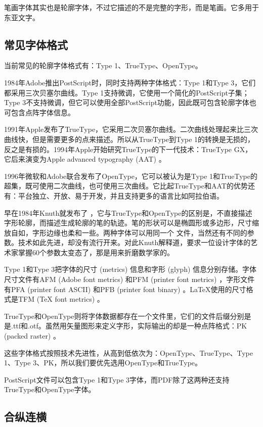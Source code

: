 笔画字体其实也是轮廓字体，不过它描述的不是完整的字形，而是笔画。它多用于东亚文字。

\subsection{常见字体格式}

当前常见的轮廓字体格式有：Type 1、TrueType、OpenType。

1984年Adobe\indexAdobe 推出PostScript时，同时支持两种字体格式：Type 1和Type 3，它们都采用三次贝塞尔曲线。Type 1支持微调，它使用一个简化的PostScript子集；Type 3不支持微调，但它可以使用全部PostScript功能，因此既可包含轮廓字体也可包含点阵字体信息。
    
1991年Apple\indexApple 发布了TrueType，它采用二次贝塞尔曲线。二次曲线处理起来比三次曲线快，但是需要更多的点来描述。所以从TrueType到Type 1的转换是无损的，反之是有损的。1994年Apple开始研究TrueType的下一代技术：TrueType GX，它后来演变为Apple advanced typography (AAT) 。

1996年微软和Adobe联合发布了OpenType，它可以被认为是Type 1和TrueType的超集，既可使用二次曲线，也可使用三次曲线。它比起TrueType和AAT的优势还有：平台独立、开放、易于开发，并且支持更多的语言比如阿拉伯语。

早在1984年Knuth就发布了 \MF ，它与TrueType和OpenType的区别是，不直接描述字形轮廓，而描述生成轮廓的笔的轨迹。笔的形状可以是椭圆形或多边形，尺寸缩放自如，字形边缘也柔和一些。两种字体可以用同一个 \MF 文件，当然还有不同的参数。\MF 技术如此先进，却没有流行开来。对此Knuth解释道，要求一位设计字体的艺术家掌握60个参数太变态了，那是用来折磨数学家的。

Type 1和Type 3把字体的尺寸 (metrics) 信息和字形 (glyph) 信息分别存储。字体尺寸文件有AFM (Adobe font metrics) 和PFM (printer font metrics) ，字形文件有PFA (printer font ASCII) 和PFB (printer font binary) 。\LaTeX 使用的尺寸格式是TFM (TeX font metrics) 。

TrueType和OpenType则将字体数据都存在一个文件里，它们的文件后缀分别是是.ttf和.otf。\MF{}虽然用矢量图形来定义字形，实际输出的却是一种点阵格式：PK (packed raster) 。

这些字体格式按照技术先进性，从高到低依次为：OpenType、TrueType、Type 1、Type 3、PK，所以我们要优先选用OpenType和TrueType。

PostScript文件可以包含Type 1和Type 3字体，而PDF除了这两种还支持TrueType和OpenType字体。

\subsection{合纵连横}

